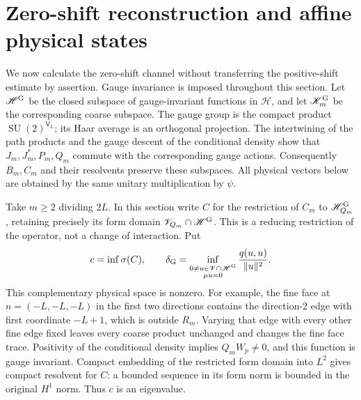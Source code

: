 \documentclass[11pt]{article}
\newcommand{\SU}{\operatorname{SU}}
\newcommand{\HH}{\mathscr H}
\newcommand{\KK}{\mathscr K}
\newcommand{\VV}{\mathscr V}
\begin{document}
\section{Zero-shift reconstruction and affine physical states}
\label{sec:zero}

We now calculate the zero-shift channel without transferring the
positive-shift estimate by assertion. Gauge invariance is imposed
throughout this section. Let $\HH^{\rm G}$ be the closed subspace of
gauge-invariant functions in $\HH$, and let $\KK_m^{\rm G}$ be the
corresponding coarse subspace. The gauge group is the compact product
$\SU(2)^{\mathsf V_L}$; its Haar average is an orthogonal projection.
The intertwining of the path products and the gauge descent of the
conditional density show that $J_m,J_m^*,P_m,Q_m$ commute with the
corresponding gauge actions. Consequently $B_m,C_m$ and their
resolvents preserve these subspaces. All physical vectors below are
obtained by the same unitary multiplication by $\psi$.

Take $m\geq2$ dividing $2L$. In this section write $C$ for the restriction
of $C_m$ to $\HH_{Q_m}^{\rm G}$, retaining precisely its form domain
$\VV_{Q_m}\cap\HH^{\rm G}$. This is a reducing restriction of the
operator, not a change of interaction. Put
\[
 c=\inf\sigma(C),\qquad
 \delta_{\rm G}=\inf_{\substack{0\ne u\in\VV\cap\HH^{\rm G}\\\mu u=0}}
                   \frac{q(u,u)}{\|u\|^2}.
\]
This complementary physical space is nonzero. For example, the fine
face at $n=(-L,-L,-L)$ in the first two directions contains the
direction-2 edge with first coordinate $-L+1$, which is outside $R_m$.
Varying that edge with every other fine edge fixed leaves every coarse
product unchanged and changes the fine face trace. Positivity of the
conditional density implies $Q_mW_p\ne0$, and this function is gauge
invariant. Compact embedding of the restricted form domain into $L^2$
gives compact resolvent for $C$: a bounded sequence in its form norm
is bounded in the original $H^1$ norm. Thus $c$ is an eigenvalue.
\end{document}

